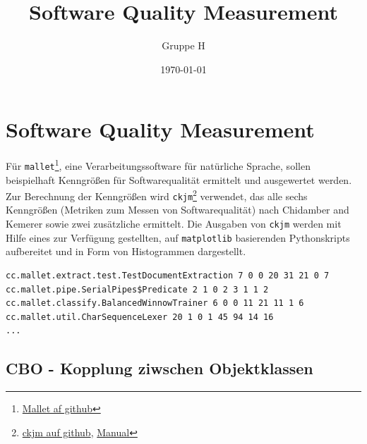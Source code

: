 \documentclass{scrreprt}
\title{Software Quality Measurement}
\author{Gruppe H}
\date{\today}
\newcommand{\lstx}[1]{\lstinline$#1$}
\begin{document}
\maketitle
\tableofcontents

\chapter{Software Quality Measurement}

Für \lstx{mallet}\footnote{\href{https://github.com/mimno/Mallet}{Mallet af github}}, eine Verarbeitungssoftware für natürliche Sprache, sollen beispielhaft Kenngrößen für Softwarequalität ermittelt und ausgewertet werden. Zur Berechnung der Kenngrößen wird \lstx{ckjm}\footnote{\href{https://github.com/dspinellis/ckjm}{ckjm auf github},  \href{https://www.spinellis.gr/sw/ckjm/doc/indexw.html}{Manual}} verwendet, das alle sechs Kenngrößen (Metriken zum Messen von Softwarequalität) nach Chidamber and Kemerer sowie zwei zusätzliche ermittelt. Die Ausgaben von \lstx{ckjm} werden mit Hilfe eines zur Verfügung gestellten, auf \lstx{matplotlib} basierenden Pythonskripts aufbereitet und in Form von Histogrammen dargestellt.

\begin{lstlisting}[caption = Beispiele für den Output von mallet]
cc.mallet.extract.test.TestDocumentExtraction 7 0 0 20 31 21 0 7
cc.mallet.pipe.SerialPipes$Predicate 2 1 0 2 3 1 1 2
cc.mallet.classify.BalancedWinnowTrainer 6 0 0 11 21 11 1 6
cc.mallet.util.CharSequenceLexer 20 1 0 1 45 94 14 16
...
\end{lstlisting}



\section{CBO - Kopplung ziwschen Objektklassen}
\end{document}
